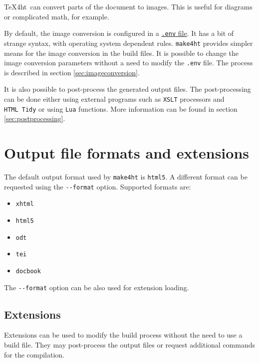 \TeX4ht~can convert parts of the document to images. This is useful for
diagrams or complicated math, for example.

By default, the image conversion is configured in a
\href{https://www.tug.org/applications/tex4ht/mn34.html\#mn35.html}{\texttt{.env}
file}. It has a bit of strange syntax, with operating system dependent
rules. \texttt{make4ht} provides simpler means for the image conversion
in the build files. It is possible to change the image conversion
parameters without a need to modify the \texttt{.env} file. The process
is described in section \ref{sec:imageconversion}.

It is also possible to post-process the generated output files. The
post-processing can be done either using external programs such as
\texttt{XSLT} processors and \texttt{HTML\ Tidy} or using \texttt{Lua}
functions. More information can be found in section
\ref{sec:postprocessing}.

\hypertarget{output-file-formats-and-extensions}{%
\section{Output file formats and
extensions}\label{output-file-formats-and-extensions}}

\label{sec:output}

The default output format used by \texttt{make4ht} is \texttt{html5}. A
different format can be requested using the \texttt{-\/-format} option.
Supported formats are:

\begin{itemize}
\tightlist
\item
  \texttt{xhtml}
\item
  \texttt{html5}
\item
  \texttt{odt}
\item
  \texttt{tei}
\item
  \texttt{docbook}
\end{itemize}

The \texttt{-\/-format} option can be also used for extension loading.

\hypertarget{extensions}{%
\subsection{Extensions}\label{extensions}}

Extensions can be used to modify the build process without the need to
use a build file. They may post-process the output files or request
additional commands for the compilation.

